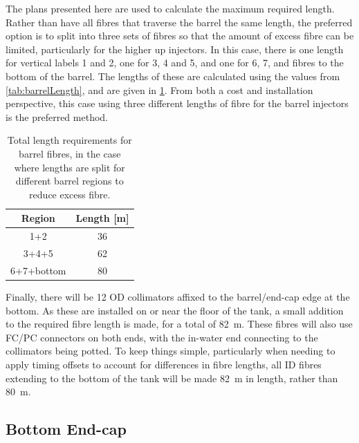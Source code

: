 \documentclass[a4paper,11pt]{article}
\begin{document}
The plans presented here are used to calculate the maximum required length. Rather than have all fibres that traverse the barrel the same length, the preferred option is to split into three sets of fibres so that the amount of excess fibre can be limited, particularly for the higher up injectors. In this case, there is one length for vertical labels 1 and 2, one for 3, 4 and 5, and one for 6, 7, and fibres to the bottom of the barrel. The lengths of these are calculated using the values from \cref{tab:barrelLength}, and are given in \cref{tab:barrelLengthSplit}. From both a cost and installation perspective, this case using three different lengths of fibre for the barrel injectors is the preferred method.
\begin{table}[h!]
\centering
\begin{tabular}{cc}\toprule
Region		&		Length [m]		\\ \midrule
1+2			&		36	\\
3+4+5		&		62	\\
6+7+bottom	&		80	\\ \bottomrule
\end{tabular}
\caption{Total length requirements for barrel fibres, in the case where lengths are split for different barrel regions to reduce excess fibre.}\label{tab:barrelLengthSplit}
\end{table}

Finally, there will be 12 OD collimators affixed to the barrel/end-cap edge at the bottom. As these are installed on or near the floor of the tank, a small addition to the required fibre length is made, for a total of 82~m. These fibres will also use FC/PC connectors on both ends, with the in-water end connecting to the collimators being potted. To keep things simple, particularly when needing to apply timing offsets to account for differences in fibre lengths, all ID fibres extending to the bottom of the tank will be made 82~m in length, rather than 80~m.

\subsection{Bottom End-cap}\label{sec:lengths:sub:bottom}
\end{document}
